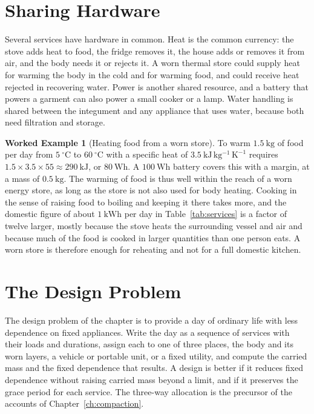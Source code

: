 \documentclass[11pt,openany]{book}
\theoremstyle{definition}
\newtheorem{example}{Worked Example}[chapter]
\theoremstyle{remark}
\begin{document}
\section{Sharing Hardware}

Several services have hardware in common. Heat is the common currency: the stove adds heat to food, the fridge removes it, the house adds or removes it from air, and the body needs it or rejects it. A worn thermal store could supply heat for warming the body in the cold and for warming food, and could receive heat rejected in recovering water. Power is another shared resource, and a battery that powers a garment can also power a small cooker or a lamp. Water handling is shared between the integument and any appliance that uses water, because both need filtration and storage.

\begin{example}[Heating food from a worn store]
\label{ex:cook}
To warm $1.5\ \mathrm{kg}$ of food per day from $5\ ^\circ\mathrm{C}$ to $60\ ^\circ\mathrm{C}$ with a specific heat of $3.5\ \mathrm{kJ\,kg^{-1}\,K^{-1}}$ requires $1.5\times3.5\times55\approx290\ \mathrm{kJ}$, or $80\ \mathrm{Wh}$. A $100\ \mathrm{Wh}$ battery covers this with a margin, at a mass of $0.5\ \mathrm{kg}$. The warming of food is thus well within the reach of a worn energy store, as long as the store is not also used for body heating. Cooking in the sense of raising food to boiling and keeping it there takes more, and the domestic figure of about $1\ \mathrm{kWh}$ per day in Table~\ref{tab:services} is a factor of twelve larger, mostly because the stove heats the surrounding vessel and air and because much of the food is cooked in larger quantities than one person eats. A worn store is therefore enough for reheating and not for a full domestic kitchen.
\end{example}

\section{The Design Problem}

The design problem of the chapter is to provide a day of ordinary life with less dependence on fixed appliances. Write the day as a sequence of services with their loads and durations, assign each to one of three places, the body and its worn layers, a vehicle or portable unit, or a fixed utility, and compute the carried mass and the fixed dependence that results. A design is better if it reduces fixed dependence without raising carried mass beyond a limit, and if it preserves the grace period for each service. The three-way allocation is the precursor of the accounts of Chapter~\ref{ch:compaction}.
\end{document}
